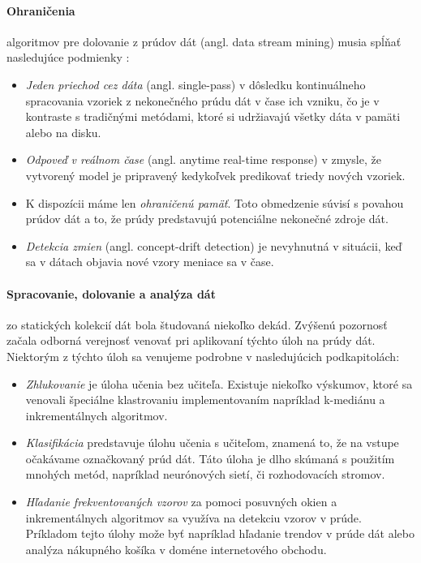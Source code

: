 \paragraph{Ohraničenia} algoritmov pre dolovanie z prúdov dát (angl. data stream mining) musia spĺňať nasledujúce podmienky \citep{babcock2002models, nguyen2015survey, wadewale2015survey}:
\begin{itemize}
	\item \textit{Jeden priechod cez dáta} (angl. single-pass) v dôsledku kontinuálneho spracovania vzoriek z nekonečného prúdu dát v čase ich vzniku, čo je v kontraste s tradičnými metódami, ktoré si udržiavajú všetky dáta v pamäti alebo na disku.
	\item \textit{Odpoveď v reálnom čase}  (angl. anytime real-time response) v zmysle, že vytvorený model je pripravený kedykoľvek predikovať triedy nových vzoriek.
	\item K dispozícii máme len \textit{ohraničenú pamäť}. Toto obmedzenie súvisí s povahou prúdov dát a to, že prúdy predstavujú potenciálne nekonečné zdroje dát.
	\item \textit{Detekcia zmien} (angl. concept-drift detection) je nevyhnutná v situácii, keď sa v dátach objavia nové vzory meniace sa v čase.
\end{itemize}

\paragraph{Spracovanie, dolovanie a analýza dát} zo statických kolekcií dát bola študovaná niekoľko dekád. Zvýšenú pozornosť začala odborná verejnosť venovať pri aplikovaní týchto úloh na prúdy dát. Niektorým z týchto úloh sa venujeme podrobne v nasledujúcich podkapitolách:
\begin{itemize}
	\item \textit{Zhlukovanie} je úloha učenia bez učiteľa. Existuje niekoľko výskumov, ktoré sa venovali špeciálne klastrovaniu implementovaním napríklad k-mediánu a inkrementálnych algoritmov.
	\item \textit{Klasifikácia} predstavuje úlohu učenia s učiteľom, znamená to, že na vstupe očakávame označkovaný prúd dát. Táto úloha je dlho skúmaná s použitím mnohých metód, napríklad neurónových sietí, či rozhodovacích stromov.
	\item \textit{Hľadanie frekventovaných vzorov} za pomoci posuvných okien a inkrementálnych algoritmov sa využíva na detekciu vzorov v prúde. Príkladom tejto úlohy može byť napríklad hľadanie trendov v prúde dát alebo analýza nákupného košíka v doméne internetového obchodu.
\end{itemize}

